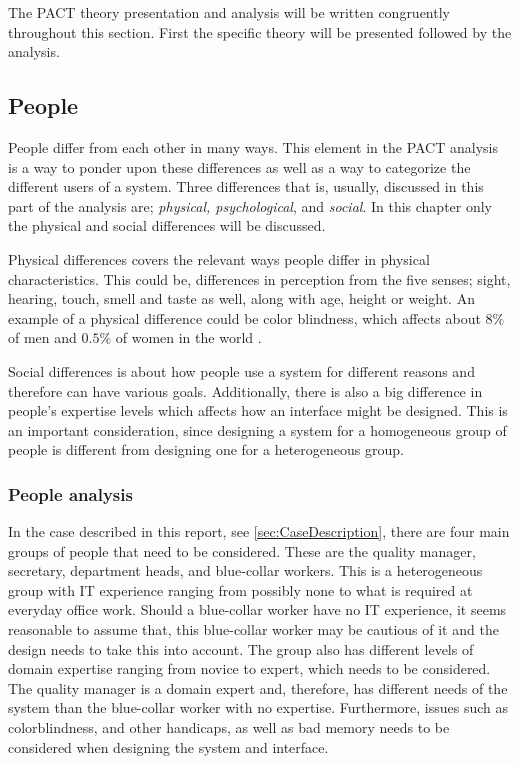 The PACT theory presentation and analysis will be written congruently throughout this section.
First the specific theory will be presented followed by the analysis.

\subsection{People}\label{sec:PACT-people}
People differ from each other in many ways.
This element in the PACT analysis is a way to ponder upon these differences as well as a way to categorize the different users of a system.
Three differences that is, usually, discussed in this part of the analysis are; \textit{physical, psychological}, and \textit{social}.
In this chapter only the physical and social differences will be discussed.

Physical differences covers the relevant ways people differ in physical characteristics.
This could be, differences in perception from the five senses; sight, hearing, touch, smell and taste as well, along with age, height or weight.
An example of a physical difference could be color blindness, which affects about $8\%$ of men and $0.5\%$ of women in the world \cite{ColourBlind}.

Social differences is about how people use a system for different reasons and therefore can have various goals.
Additionally, there is also a big difference in people's expertise levels which affects how an interface might be designed.
This is an important consideration, since designing a system for a homogeneous group of people is  different from designing one for a heterogeneous group. \cite{Benyon}

\subsubsection*{People analysis}
In the case described in this report, see \cref{sec:CaseDescription}, there are four main groups of people that need to be considered.
These are the quality manager, secretary, department heads, and blue-collar workers.
This is a heterogeneous group with IT experience ranging from possibly none to what is required at everyday office work.
Should a blue-collar worker have no IT experience, it seems reasonable to assume that, this blue-collar worker may be cautious of it and the design needs to take this into account.
The group also has different levels of domain expertise ranging from novice to expert, which needs to be considered.
The quality manager is a domain expert and, therefore, has different needs of the system than the blue-collar worker with no expertise.
Furthermore, issues such as colorblindness, and other handicaps, as well as bad memory needs to be considered when designing the system and interface.

